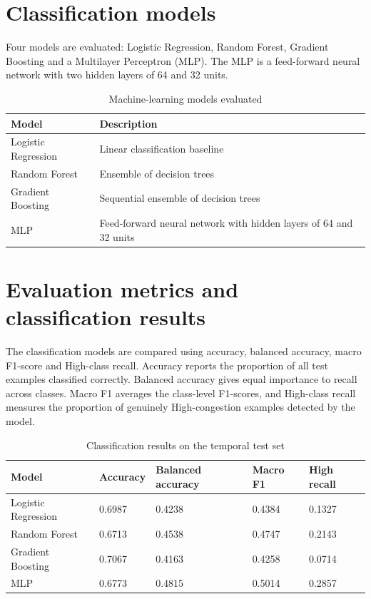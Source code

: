 \documentclass[12pt,a4paper,oneside]{report}
\begin{document}
\section{Classification models}
Four models are evaluated: Logistic Regression, Random Forest, Gradient Boosting and a Multilayer Perceptron (MLP). The MLP is a feed-forward neural network with two hidden layers of 64 and 32 units.

\begin{table}[htbp]\centering\small
\caption{Machine-learning models evaluated}\label{tab:models}
\begin{tabular}{|p{}|p{}|}\hline
\textbf{Model} & \textbf{Description} \\\hline
Logistic Regression & Linear classification baseline \\\hline
Random Forest & Ensemble of decision trees \\\hline
Gradient Boosting & Sequential ensemble of decision trees \\\hline
MLP & Feed-forward neural network with hidden layers of 64 and 32 units \\\hline
\end{tabular}\end{table}

\section{Evaluation metrics and classification results}
The classification models are compared using accuracy, balanced accuracy, macro F1-score and High-class recall. Accuracy reports the proportion of all test examples classified correctly. Balanced accuracy gives equal importance to recall across classes. Macro F1 averages the class-level F1-scores, and High-class recall measures the proportion of genuinely High-congestion examples detected by the model.

\begin{table}[htbp]\centering\small
\caption{Classification results on the temporal test set}\label{tab:ml-results}
\setlength{\tabcolsep}{3pt}
\begin{tabular}{|p{}|p{}|p{}|p{}|p{}|}\hline
\textbf{Model} & \textbf{Accuracy} & \textbf{Balanced accuracy} & \textbf{Macro F1} & \textbf{High recall} \\\hline
Logistic Regression & 0.6987 & 0.4238 & 0.4384 & 0.1327 \\\hline
Random Forest & 0.6713 & 0.4538 & 0.4747 & 0.2143 \\\hline
Gradient Boosting & 0.7067 & 0.4163 & 0.4258 & 0.0714 \\\hline
MLP & 0.6773 & 0.4815 & 0.5014 & 0.2857 \\\hline
\end{tabular}\end{table}
\end{document}
